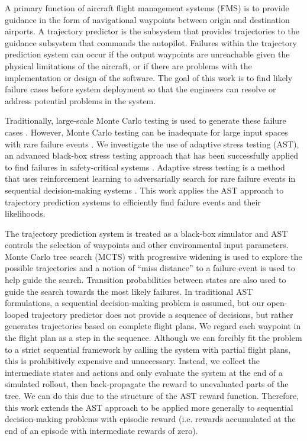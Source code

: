 
A primary function of aircraft flight management systems (FMS) is to provide guidance in the form of navigational waypoints between origin and destination airports.
A trajectory predictor is the subsystem that provides trajectories to the guidance subsystem that commands the autopilot.
Failures within the trajectory prediction system can occur if the output waypoints are unreachable given the physical limitations of the aircraft, or if there are problems with the implementation or design of the software. %
The goal of this work is to find likely failure cases before system deployment so that the engineers can resolve or address potential problems in the system. 

Traditionally, large-scale Monte Carlo testing is used to generate these failure cases \cite{monte_carlo}. However, Monte Carlo testing can be inadequate for large input spaces with rare failure events \cite{mc_limitations}.
We investigate the use of adaptive stress testing (AST), an advanced black-box stress testing approach that has been successfully applied to find failures in safety-critical systems \cite{ast_acasx,ast_av,lee2018differential,ast_safety}. Adaptive stress testing is a method that uses reinforcement learning to adversarially search for rare failure events in sequential decision-making systems \cite{lee_thesis}. This work applies the AST approach to trajectory prediction systems to efficiently find failure events and their likelihoods.

The trajectory prediction system is treated as a black-box simulator and AST controls the selection of waypoints and other environmental input parameters.
Monte Carlo tree search (MCTS) with progressive widening is used to explore the possible trajectories and a notion of ``miss distance'' to a failure event is used to help guide the search.
Transition probabilities between states are also used to guide the search towards the most likely failures.
% 
In traditional AST formulations, a sequential decision-making problem is assumed, but our open-looped trajectory predictor does not provide a sequence of decisions, but rather generates trajectories based on complete flight plans.
We regard each waypoint in the flight plan as a step in the sequence.
Although we can forcibly fit the problem to a strict sequential framework by calling the system with partial flight plans, this is prohibitively expensive and unnecessary.
Instead, we collect the intermediate states and actions and only evaluate the system at the end of a simulated rollout, then back-propagate the reward to unevaluated parts of the tree.
We can do this due to the structure of the AST reward function.
Therefore, this work extends the AST approach to be applied more generally to sequential decision-making problems with episodic reward (i.e. rewards accumulated at the end of an episode with intermediate rewards of zero).



